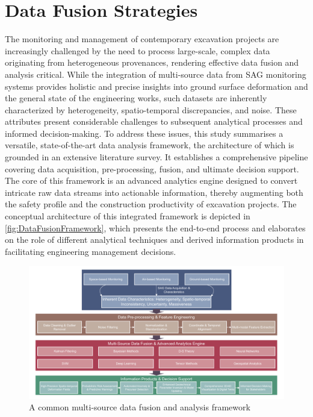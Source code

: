 \documentclass[preprint,11pt,authoryear,3p]{elsarticle}
\begin{document}
\section{Data Fusion Strategies}\label{sec.fusion}

The monitoring and management of contemporary excavation projects are increasingly challenged by the need to process large-scale, complex data originating from heterogeneous provenances, rendering effective data fusion and analysis critical. While the integration of multi-source data from SAG monitoring systems provides holistic and precise insights into ground surface deformation and the general state of the engineering works, such datasets are inherently characterized by heterogeneity, spatio-temporal discrepancies, and noise. These attributes present considerable challenges to subsequent analytical processes and informed decision-making. To address these issues, this study summarises a versatile, state-of-the-art data analysis framework, the architecture of which is grounded in an extensive literature survey. It establishes a comprehensive pipeline covering data acquisition, pre-processing, fusion, and ultimate decision support. The core of this framework is an advanced analytics engine designed to convert intricate raw data streams into actionable information, thereby augmenting both the safety profile and the construction productivity of excavation projects. The conceptual architecture of this integrated framework is depicted in \autoref{fig:DataFusionFramework}, which presents the end-to-end process and elaborates on the role of different analytical techniques and derived information products in facilitating engineering management decisions.

\begin{figure}[h]
    \centering 
    \includegraphics[width=\textwidth]{imgs/IntegratedAnalysis.pdf}
    \caption{A common multi-source data fusion and analysis framework}
    \label{fig:DataFusionFramework}
\end{figure}
\end{document}

